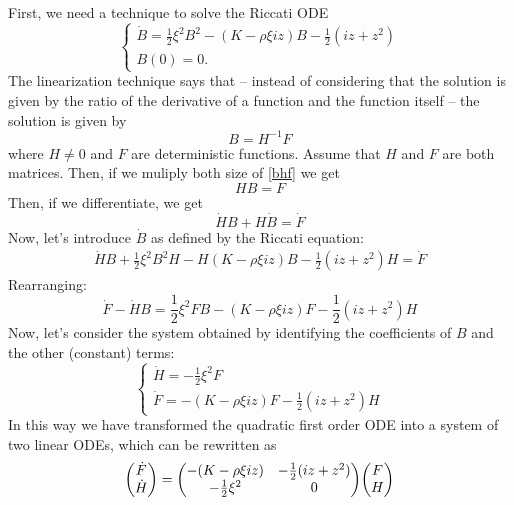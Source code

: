 First, we need a technique to solve the Riccati ODE
\begin{equation*}
    \begin{cases}
        \dot{B} = \frac{1}{2}\xi^2B^2 - (K-\rho\xi i z)B - \frac{1}{2}(iz+z^2) \\
        B(0) = 0.
    \end{cases}
\end{equation*}
The linearization technique says that -- instead of considering that the solution is given by the ratio of the derivative of a function and the function itself -- the solution is given by
\begin{equation}\label{bhf}
    B = H^{-1}F
\end{equation}
where $H \ne 0$ and $F$ are deterministic functions. Assume that $H$ and $F$ are both matrices. Then, if we muliply both size of \eqref{bhf} we get
\begin{equation*}
    HB = F
\end{equation*}
Then, if we differentiate, we get
\begin{equation*}
    \dot{H}B + H\dot{B} = \dot{F}
\end{equation*}
Now, let's introduce $\dot{B}$ as defined by the Riccati equation:
\begin{align*}
    \dot{H}B + \frac{1}{2}\xi^2B^2H - H(K-\rho\xi i z)B - \frac{1}{2}(iz+z^2)H = \dot{F}
\end{align*}
Rearranging:
\begin{equation*}
    \dot{F} - \dot{H}B = \frac{1}{2}\xi^2FB - (K-\rho\xi i z)F - \frac{1}{2}(iz+z^2)H
\end{equation*}
Now, let's consider the system obtained by identifying the coefficients of $B$ and the other (constant) terms:
\begin{equation*}
    \begin{cases}
        \dot{H} = -\frac{1}{2}\xi^2F \\
        \dot{F} = -(K-\rho\xi i z)F - \frac{1}{2}(iz+z^2)H
    \end{cases}
\end{equation*}
In this way we have transformed the quadratic first order ODE into a system of two linear ODEs, which can be rewritten as
\begin{equation}\label{HFlinearsys}
    \mqty(\dot{F}\\\dot{H}) = \mqty(-(K-\rho\xi iz) & - \frac{1}{2}(iz+z^2) \\ -\tfrac{1}{2}\xi^2 & 0) \mqty(F \\ H)
\end{equation}

